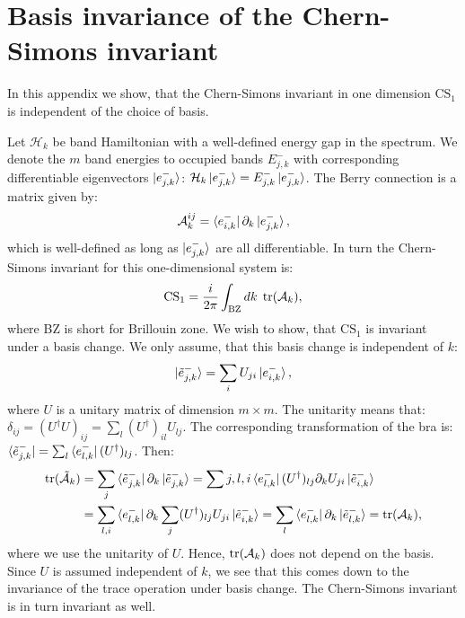 
\chapter{Basis invariance of the Chern-Simons invariant} %

\label{AppendixC} %
\chead{}

In this appendix we show, that the Chern-Simons invariant in one dimension $\text{CS}_1$ is independent of the choice of basis. 

Let $\mathcal{H}_k$ be band Hamiltonian with a well-defined energy gap in the spectrum. We denote the $m$ band energies to occupied bands $E^{-}_{j,k}$ with corresponding differentiable eigenvectors $\ket{e^{-}_{j,k}}$: $\mathcal{H}_k\ket{e^{-}_{j,k}} = E^{-}_{j,k}\ket{e^{-}_{j,k}}$. The Berry connection is a matrix given by:
\begin{equation}
\mathcal{A}^{ij}_k = \bra{e^{-}_{i,k}}\partial_k \ket{e^{-}_{j,k}}, 
\label{eq.Berryconnectiongeneral}
\end{equation}
which is well-defined as long as $\ket{e^{-}_{j,k}}$ are all differentiable. In turn the Chern-Simons invariant for this one-dimensional system is:
\begin{equation}
\text{CS}_1 = \frac{i}{2\pi}\int_{\text{BZ}} dk\; \operatorname{tr}(\mathcal{A}_k),
\label{eq.Chernsimonsgeneral}
\end{equation}
where BZ is short for Brillouin zone. We wish to show, that $\text{CS}_1$ is invariant under a basis change. We only assume, that this basis change is independent of $k$:
\begin{equation}
\ket{\tilde{e}^{-}_{j,k}} = \sum_i U_{ji}\ket{e^{-}_{i,k}},
\end{equation} 
where $U$ is a unitary matrix of dimension $m \times m$. The unitarity means that: $\delta_{ij} = (U^\dagger U )_{ij} = \sum_l (U^\dagger)_{il}U_{lj}$. The corresponding transformation of the bra is: $\bra{\tilde{e}^{-}_{j,k}} = \sum_l \bra{e^{-}_{l,k}}(U^\dagger)_{lj}$. Then:
\begin{align}
\operatorname{tr}(\tilde{\mathcal{A}}_k) &= \sum_j \bra{\tilde{e}^{-}_{j,k}}\partial_k\ket{\tilde{e}^{-}_{j,k}} = \sum{j,l,i}\bra{e^{-}_{l,k}}(U^\dagger)_{lj}\partial_kU_{ji}\ket{\tilde{e}^{-}_{i,k}} \nonumber \\
&= \sum_{l,i}\bra{e^{-}_{l,k}}\partial_k\sum_{j}(U^\dagger)_{lj}U_{ji}\ket{\tilde{e}^{-}_{i,k}} = \sum_{l}\bra{e^{-}_{l,k}}\partial_k\ket{\tilde{e}^{-}_{l,k}} = \operatorname{tr}(\mathcal{A}_k), \nonumber
\end{align}
where we use the unitarity of $U$. Hence, $\operatorname{tr}(\mathcal{A}_k)$ does not depend on the basis. Since $U$ is assumed independent of $k$, we see that this comes down to the invariance of the trace operation under basis change. The Chern-Simons invariant is in turn invariant as well. 